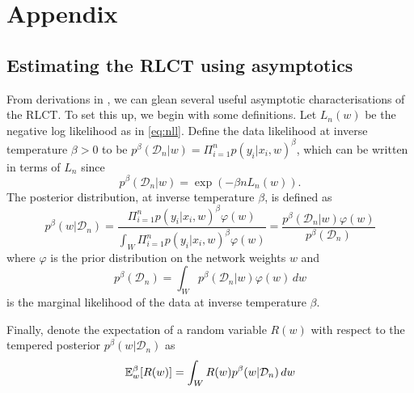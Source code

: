 \documentclass{article} %
\begin{document}



\appendix
\section{Appendix}

\subsection{Estimating the RLCT using asymptotics}
\label{appendix:RLCT_estimation}

From derivations in \citep{watanabe_widely_2013}, we can glean several useful asymptotic characterisations of the RLCT. To set this up, we begin with some definitions. 
Let $L_n(w)$ be the negative log likelihood as in \eqref{eq:nll}. Define the data likelihood at inverse temperature $\beta >0$ to be $p^\beta(\mathcal D_n | w) = \Pi_{i=1}^n p(y_i |x_i, w)^\beta$, which can be written in terms of $L_n$ since
\begin{equation}
p^\beta(\mathcal D_n | w) = \exp(-\beta n L_n(w)).
\label{general_likelihood}
\end{equation}
The posterior distribution, at inverse temperature $\beta$, is defined as 
\begin{equation}
p^\beta(w|\mathcal D_n) = \frac{\Pi_{i=1}^n p(y_i|x_i,w)^\beta \varphi(w)}{\int_W \Pi_{i=1}^n p(y_i|x_i,w)^\beta \varphi(w)} = \frac{p^\beta(\mathcal D_n|w) \varphi(w)}{p^\beta(\mathcal D_n)}
\label{general_posterior}
\end{equation}
where $\varphi$ is the prior distribution on the network weights $w$ and
\begin{equation}
p^\beta(\mathcal D_n) = \int_W p^\beta(\mathcal D_n|w) \varphi(w) \,dw
\label{general_marginal_likelihood}
\end{equation}
is the marginal likelihood of the data at inverse temperature $\beta$. 

Finally, denote the expectation of a random variable $R(w)$ with respect to the tempered posterior $p^\beta(w|\mathcal D_n)$ as
\begin{equation}
{\mathbb{E}}_w^\beta [R(w)] = \int_W R(w) p^\beta(w|\mathcal D_n) \,dw
\label{general_expectation_posterior}
\end{equation}
\end{document}
